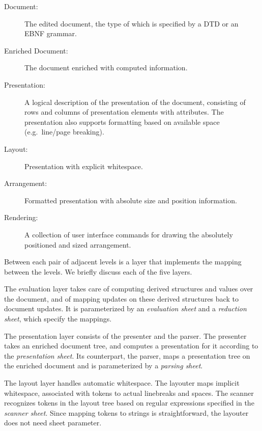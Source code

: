 \documentclass[12pt]{article}
\begin{document}
\begin{description}
\item[Document:] The edited document, the type of which is specified by a DTD or an EBNF grammar.

\item[Enriched Document:] The document enriched with computed information.

\item[Presentation:] A logical description of the presentation of the document, consisting of rows and columns of presentation elements with attributes. The presentation also supports formatting based on available space (e.g.\ line/page breaking).

\item[Layout:]  Presentation with explicit whitespace.

\item[Arrangement:] Formatted presentation with absolute size and position information.

\item[Rendering:] A collection of user interface commands for drawing the absolutely positioned and sized arrangement.
\end{description}

Between each pair of adjacent levels is a layer that implements the mapping between the levels. We briefly discuss each of the five layers.

\noindent The evaluation layer takes care of computing derived structures and values over the document, and of mapping updates on these derived structures back to document updates. It is parameterized by an {\em evaluation sheet} and a {\em reduction sheet}, which specify the mappings. 

\noindent The presentation layer consists of the presenter and the parser. The presenter takes an enriched document tree, and computes a presentation for it according to the {\em presentation sheet}. Its counterpart, the parser, maps a presentation tree on the enriched document and is parameterized by a {\em parsing sheet}.

\noindent The layout layer handles automatic whitespace. The layouter maps implicit whitespace, associated with tokens to actual linebreaks and spaces. The scanner recognizes tokens in the layout tree based on regular expressions specified in the {\em scanner sheet}. Since mapping tokens to strings is straightforward, the layouter does not need sheet parameter.
\end{document}

